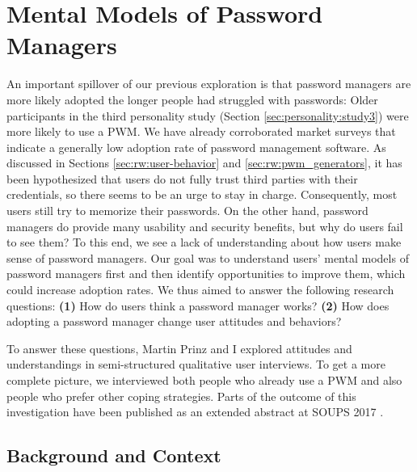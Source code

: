 \chapter[Mental Models of Password Managers]{Mental Models of Password Managers}\label{chap:mental_models_pwm}
An important spillover of our previous exploration is that password managers are more likely adopted the longer people had struggled with passwords: Older participants in the third personality study (Section \ref{sec:personality:study3}) were more likely to use a \gls{PWM}. We have already corroborated market surveys that indicate a generally low adoption rate of password management software. As discussed in Sections \ref{sec:rw:user-behavior} and \ref{sec:rw:pwm_generators}, it has been hypothesized that users do not fully trust third parties with their credentials, so there seems to be an urge to stay in charge. Consequently, most users still try to memorize their passwords. On the other hand, password managers do provide many usability and security benefits, but why do users fail to see them? To this end, we see a lack of understanding about how users make sense of password managers. Our goal was to understand users' mental models of password managers first and then identify opportunities to improve them, which could increase adoption rates. 
We thus aimed to answer the following research questions: 
\textbf{(1)} How do users think a password manager works? 
\textbf{(2)} How does adopting a password manager change user attitudes and behaviors?


To answer these questions, Martin Prinz and I explored attitudes and understandings in semi-structured qualitative user interviews. To get a more complete picture, we interviewed both people who already use a \gls{PWM} and also people who prefer other coping strategies. Parts of the outcome of this investigation have been published as an extended abstract at SOUPS 2017 \cite{Prinz2017MentalModel}.

\section{Background and Context}

